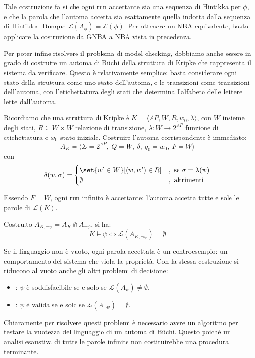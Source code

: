 Tale costruzione fa si che ogni run accettante sia una sequenza di Hintikka per \(\phi\), e che la parola che l'automa accetta sia esattamente quella indotta dalla sequenza di Hintikka. Dunque \(\mathcal{L}(A_\phi) = \mathcal{L}(\phi)\). Per ottenere un NBA equivalente, basta applicare la costruzione da GNBA a NBA vista in precedenza.

Per poter infine risolvere il problema di model checking, dobbiamo anche essere in grado di costruire un automa di Büchi della struttura di Kripke che rappresenta il sistema da verificare. Questo è relativamente semplice: basta considerare ogni stato della struttura come uno stato dell'automa, e le transizioni come transizioni dell'automa, con l'etichettatura degli stati che determina l'alfabeto delle lettere lette dall'automa.

Ricordiamo che una struttura di Kripke è \(K = \langle AP, W, R, w_0, \lambda\rangle\), con \(W\) insieme degli stati, \(R \subseteq W\times W\) relazione di transizione, \(\lambda: W \to 2^{AP}\) funzione di etichettatura e \(w_0\) stato iniziale. Costruire l'automa corrispondente è immediato:
\[A_K = \langle \Sigma=2^{AP},\ Q = W,\ \delta,\ q_0 = w_0,\ F=W\rangle\]
con
\[\delta(w,\sigma) = \begin{cases}
    \set{w' \in W}[(w,w') \in R] & , \text{ se } \sigma = \lambda(w) \\
    \emptyset                    & , \text{ altrimenti}
  \end{cases}\]

Essendo \(F = W\), ogni run infinito è accettante: l'automa accetta tutte e sole le parole di \(\mathcal{L}(K)\).

Costruito \(A_{K,\neg\psi} = A_K \Cap A_{\neg\psi}\), si ha:
\[K\models \psi \iff \mathcal{L}(A_{K,\neg\psi}) = \emptyset\]

Se il linguaggio non è vuoto, ogni parola accettata è un controesempio: un comportamento del sistema che viola la proprietà. Con la stessa costruzione si riducono al vuoto anche gli altri problemi di decisione:
\begin{itemize}
  \item {}: \(\psi\) è soddisfacibile se e solo se \(\mathcal{L}(A_\psi)\neq \emptyset\).
  \item {}: \(\psi\) è valida se e solo se \(\mathcal{L}(A_{\neg\psi}) = \emptyset\).
\end{itemize}

Chiaramente per risolvere questi problemi è necessario avere un algoritmo per testare la vuotezza del linguaggio di un automa di Büchi. Questo poiché un analisi esaustiva di tutte le parole infinite non costituirebbe una procedura terminante.

